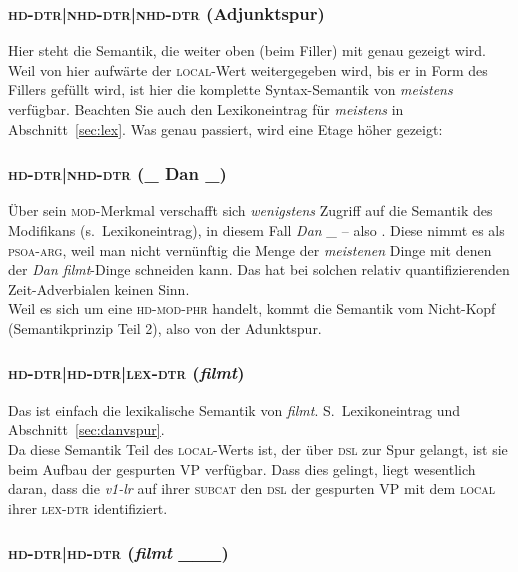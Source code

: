 \documentclass[10pt,a3paper]{article}
\newcommand*{\mybox}[1]{\framebox{#1}}
\begin{document}
\subsubsection{\textsc{hd-dtr|nhd-dtr|nhd-dtr} (Adjunktspur)}\label{sec:aspur}

Hier steht die Semantik, die weiter oben (beim Filler) mit \mybox{1000} genau gezeigt wird.
Weil von hier aufwärte der \textsc{local}-Wert \mybox{200} weitergegeben wird, bis er in Form des Fillers gefüllt wird, ist hier die komplette Syntax-Semantik von \textit{meistens} verfügbar.
Beachten Sie auch den Lexikoneintrag für \textit{meistens} in Abschnitt~\ref{sec:lex}.
Was genau passiert, wird eine Etage höher gezeigt:

\subsubsection{\textsc{hd-dtr|nhd-dtr} (\_ Dan \_)}

Über sein \textsc{mod}-Merkmal verschafft sich \textit{wenigstens} Zugriff auf die Semantik des Modifikans (s.\ Lexikoneintrag), in diesem Fall \textit{Dan \_} -- also \mybox{1002}.
Diese nimmt es als \textsc{psoa-arg}, weil man nicht vernünftig die Menge der \textit{meistenen} Dinge mit denen der \textit{Dan filmt}-Dinge schneiden kann.
Das hat bei solchen relativ quantifizierenden Zeit-Adverbialen keinen Sinn.\\

Weil es sich um eine \textsc{hd-mod-phr} handelt, kommt die Semantik vom Nicht-Kopf (Semantikprinzip Teil 2), also \mybox{1000} von der Adunktspur.

\subsubsection{\textsc{hd-dtr|hd-dtr|lex-dtr} (\textit{filmt})}

Das ist einfach die lexikalische Semantik von \textit{filmt}.
S.\ Lexikoneintrag und Abschnitt~\ref{sec:danvspur}.\\

Da diese Semantik Teil des \textsc{local}-Werts \mybox{1} ist, der über \textsc{dsl} zur Spur gelangt, ist sie beim Aufbau der gespurten VP verfügbar.
Dass dies gelingt, liegt wesentlich daran, dass die \textit{v1-lr} auf ihrer \textsc{subcat} den \textsc{dsl} der gespurten VP mit dem \textsc{local} ihrer \textsc{lex-dtr} identifiziert.

\subsubsection{\textsc{hd-dtr|hd-dtr} (\textit{filmt \_\_\_})}\label{sec:v1lr}
\end{document}

